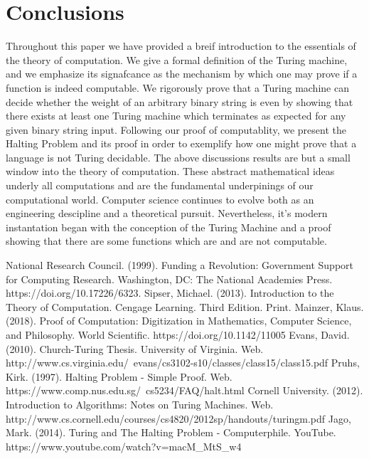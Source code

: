 \documentclass{article}
\begin{document}
\section{Conclusions}
Throughout this paper we have provided a breif introduction to the essentials of the theory of computation. We give a formal definition of the Turing machine, and we emphasize its signafcance as the mechanism by which one may prove if a function is indeed computable.  We rigorously prove that a Turing machine can decide whether the weight of an arbitrary binary string is even by showing that there exists at least one Turing machine which terminates as expected for any given binary string input.  Following our proof of computablity, we present the Halting Problem and its proof in order to exemplify how one might prove that a language is not Turing decidable.  The above discussions results are but a small window into the theory of computation.  These abstract mathematical ideas underly all computations and are the fundamental underpinings of our computational world.  Computer science continues to evolve both as an engineering descipline and a theoretical pursuit.  Nevertheless, it's modern instantation began with the conception of the Turing Machine and a proof showing that there are some functions which are and are not computable.

\begin{thebibliography}{100}
	 National Research Council. (1999). Funding a Revolution: Government Support for Computing Research. Washington, DC: The National Academies Press. https://doi.org/10.17226/6323.
	 Sipser, Michael. (2013). Introduction to the Theory of Computation. Cengage Learning. Third Edition. Print.
	 Mainzer, Klaus. (2018). Proof of Computation: Digitization in Mathematics, Computer Science, and Philosophy. World Scientific. https://doi.org/10.1142/11005
	 Evans, David. (2010). Church-Turing Thesis. University of Virginia. Web. http://www.cs.virginia.edu/~evans/cs3102-s10/classes/class15/class15.pdf
	 Pruhs, Kirk. (1997). Halting Problem - Simple Proof. Web. https://www.comp.nus.edu.sg/~cs5234/FAQ/halt.html
	 Cornell University. (2012). Introduction to Algorithms: Notes on Turing Machines. Web. http://www.cs.cornell.edu/courses/cs4820/2012sp/handouts/turingm.pdf
	 Jago, Mark. (2014). Turing and The Halting Problem - Computerphile. YouTube. https://www.youtube.com/watch?v=macM\_MtS\_w4
\end{thebibliography}
\end{document}
